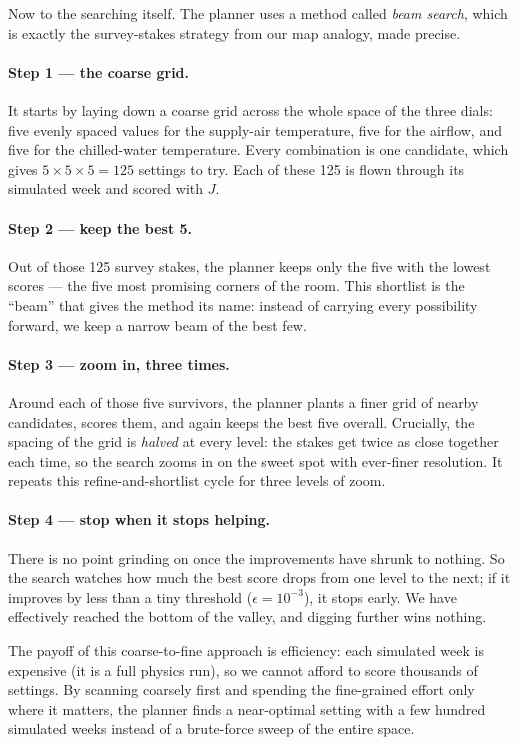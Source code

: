 \documentclass[11pt]{report}
\begin{document}
Now to the searching itself. The planner uses a method called \emph{beam search}, which is exactly the survey-stakes strategy from our map analogy, made precise.

\paragraph{Step 1 --- the coarse grid.} It starts by laying down a coarse grid across the whole space of the three dials: five evenly spaced values for the supply-air temperature, five for the airflow, and five for the chilled-water temperature. Every combination is one candidate, which gives $5 \times 5 \times 5 = 125$ settings to try. Each of these 125 is flown through its simulated week and scored with $J$.

\paragraph{Step 2 --- keep the best 5.} Out of those 125 survey stakes, the planner keeps only the five with the lowest scores --- the five most promising corners of the room. This shortlist is the ``beam'' that gives the method its name: instead of carrying every possibility forward, we keep a narrow beam of the best few.

\paragraph{Step 3 --- zoom in, three times.} Around each of those five survivors, the planner plants a finer grid of nearby candidates, scores them, and again keeps the best five overall. Crucially, the spacing of the grid is \emph{halved} at every level: the stakes get twice as close together each time, so the search zooms in on the sweet spot with ever-finer resolution. It repeats this refine-and-shortlist cycle for three levels of zoom.

\paragraph{Step 4 --- stop when it stops helping.} There is no point grinding on once the improvements have shrunk to nothing. So the search watches how much the best score drops from one level to the next; if it improves by less than a tiny threshold ($\epsilon = 10^{-3}$), it stops early. We have effectively reached the bottom of the valley, and digging further wins nothing.

The payoff of this coarse-to-fine approach is efficiency: each simulated week is expensive (it is a full physics run), so we cannot afford to score thousands of settings. By scanning coarsely first and spending the fine-grained effort only where it matters, the planner finds a near-optimal setting with a few hundred simulated weeks instead of a brute-force sweep of the entire space.
\end{document}
